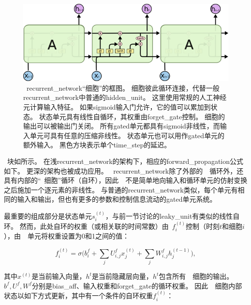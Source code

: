 \begin{figure}[!h]
	\centering
	\includegraphics[scale=0.6]{figures/chapter_2/fig_2_5.png}
	\caption{~\gls{recurrent_network}``细胞''的框图。
		细胞彼此循环连接，代替一般\gls{recurrent_network}中普通的\gls{hidden_unit}。
		这里使用常规的人工神经元计算输入特征。
		如果sigmoid输入门允许，它的值可以累加到状态。
		状态单元具有线性自循环，其权重由\gls{forget_gate}控制。
		细胞的输出可以被输出门关闭。
		所有\gls{gated}单元都具有sigmoid非线性，而输入单元可具有任意的压缩非线性。
		状态单元也可以用作\gls{gated}单元的额外输入。
		黑色方块表示单个\gls{time_step}的延迟。
	}\label{fig:chapter2_lstm_cell}
\end{figure}

~块如所示。
在浅\gls{recurrent_network}的架构下，相应的\gls{forward_propagation}公式如下。
更深的架构也被成功应用\citep{Graves-et-al-ICASSP2013,Pascanu-et-al-ICLR2014}。
~\gls{recurrent_network}除了外部的~~循环外，还具有内部的``~细胞''循环（自环），因此~~不是简单地向输入和循环单元的仿射变换之后施加一个逐元素的非线性。
与普通的\gls{recurrent_network}类似，每个单元有相同的输入和输出，但也有更多的参数和控制信息流动的\gls{gated}单元系统。

最重要的组成部分是状态单元$s_i^{(t)}$，与前一节讨论的\gls{leaky_unit}有类似的线性自环。
然而，此处自环的权重（或相关联的时间常数）由~$f_i^{(t)}$控制（时刻$t$和细胞$i$），由~~单元将权重设置为0和1之间的值：

\begin{equation}
f_i^{(t)} = \sigma \Big( b_i^f + \sum_j U_{i,j}^f x_j^{(t)} + \sum_j W_{i,j}^f h_j^{(t-1)} \Big),
\end{equation}

其中$x^{(t)}$是当前输入向量，$h^{t}$是当前隐藏层向量，$h^{t}$包含所有~~细胞的输出。 
$b^f, U^f, W^f$分别是\gls{bias_aff}、输入权重和\gls{forget_gate}的循环权重。
因此~~细胞内部状态以如下方式更新，其中有一个条件的自环权重$f_i^{(t)}$：

